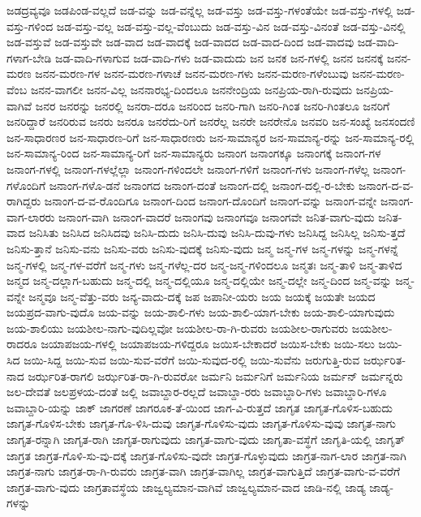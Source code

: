 {ಜಡದ್ರವ್ಯವೂ
ಜಡಪಿಂಡ-ವಲ್ಲದೆ
ಜಡ-ವನ್ನು
ಜಡ-ವನ್ನೆಲ್ಲ
ಜಡ-ವಸ್ತು
ಜಡ-ವಸ್ತು-ಗಳಂತೆಯೇ
ಜಡ-ವಸ್ತು-ಗಳಲ್ಲಿ
ಜಡ-ವಸ್ತು-ಗಳಿಂದ
ಜಡ-ವಸ್ತು-ವಲ್ಲ
ಜಡ-ವಸ್ತು-ವಲ್ಲ-ವೆಂಬುದು
ಜಡ-ವಸ್ತು-ವಿನ
ಜಡ-ವಸ್ತು-ವಿನಂತೆ
ಜಡ-ವಸ್ತು-ವಿನಲ್ಲಿ
ಜಡ-ವಸ್ತುವೆ
ಜಡ-ವಸ್ತುವೇ
ಜಡ-ವಾದ
ಜಡ-ವಾದಕ್ಕೆ
ಜಡ-ವಾದದ
ಜಡ-ವಾದ-ದಿಂದ
ಜಡ-ವಾದವು
ಜಡ-ವಾದಿ-ಗಳಾಗ-ಬೇಡಿ
ಜಡ-ವಾದಿ-ಗಳಾಗುವ
ಜಡ-ವಾದಿ-ಗಳು
ಜಡ-ವಾದುದು
ಜನ
ಜನಕ
ಜನ-ಗಳಲ್ಲಿ
ಜನನ
ಜನನಕ್ಕೆ
ಜನನ-ಮರಣ
ಜನನ-ಮರಣ-ಗಳ
ಜನನ-ಮರಣ-ಗಳಾಚೆ
ಜನನ-ಮರಣ-ಗಳು
ಜನನ-ಮರಣ-ಗಳೆಂಬುವು
ಜನನ-ಮರಣ-ವೆಂಬ
ಜನನ-ವಾಗಲೀ
ಜನನ-ವಿಲ್ಲ
ಜನನಾರಭ್ಯ-ದಿಂದಲೂ
ಜನನೇಂದ್ರಿಯ
ಜನಪ್ರಿಯ-ರಾಗಿ-ರುವುದು
ಜನಪ್ರಿಯ-ವಾಗಿವೆ
ಜನರ
ಜನರನ್ನು
ಜನರಲ್ಲಿ
ಜನರಾ-ದರೂ
ಜನರಿಂದ
ಜನರಿ-ಗಾಗಿ
ಜನರಿ-ಗಿಂತ
ಜನರಿ-ಗಿಂತಲೂ
ಜನರಿಗೆ
ಜನರಿದ್ದಾರೆ
ಜನರಿರುವ
ಜನರು
ಜನರೂ
ಜನರೆದು-ರಿಗೆ
ಜನರೆಲ್ಲ
ಜನರೇ
ಜನರೇನೊ
ಜನವರಿ
ಜನ-ಸಂಖ್ಯೆ
ಜನಸಂದಣಿ
ಜನ-ಸಾಧಾರಣರ
ಜನ-ಸಾಧಾರಣ-ರಿಗೆ
ಜನ-ಸಾಧಾರಣರು
ಜನ-ಸಾಮಾನ್ಯರ
ಜನ-ಸಾಮಾನ್ಯ-ರನ್ನು
ಜನ-ಸಾಮಾನ್ಯ-ರಲ್ಲಿ
ಜನ-ಸಾಮಾನ್ಯ-ರಿಂದ
ಜನ-ಸಾಮಾನ್ಯ-ರಿಗೆ
ಜನ-ಸಾಮಾನ್ಯರು
ಜನಾಂಗ
ಜನಾಂಗಕ್ಕೂ
ಜನಾಂಗಕ್ಕೆ
ಜನಾಂಗ-ಗಳ
ಜನಾಂಗ-ಗಳಲ್ಲಿ
ಜನಾಂಗ-ಗಳಲ್ಲೆಲ್ಲಾ
ಜನಾಂಗ-ಗಳಿಂದಲೇ
ಜನಾಂಗ-ಗಳಿಗೆ
ಜನಾಂಗ-ಗಳು
ಜನಾಂಗ-ಗಳೆಲ್ಲ
ಜನಾಂಗ-ಗಳೊಂದಿಗೆ
ಜನಾಂಗ-ಗಳೊ-ಡನೆ
ಜನಾಂಗದ
ಜನಾಂಗ-ದಂತೆ
ಜನಾಂಗ-ದಲ್ಲಿ
ಜನಾಂಗ-ದಲ್ಲಿ-ರ-ಬೇಕು
ಜನಾಂಗ-ದ-ವ-ರಾಗಿದ್ದರು
ಜನಾಂಗ-ದ-ವ-ರೊಂದಿಗೂ
ಜನಾಂಗ-ದಿಂದ
ಜನಾಂಗ-ದೊಂದಿಗೆ
ಜನಾಂಗ-ವನ್ನು
ಜನಾಂಗ-ವನ್ನೇ
ಜನಾಂಗ-ವಾಗ-ಲಾರರು
ಜನಾಂಗ-ವಾಗಿ
ಜನಾಂಗ-ವಾದರೆ
ಜನಾಂಗವು
ಜನಾಂಗವೂ
ಜನಾಂಗವೇ
ಜನಿತ-ವಾಗು-ವುದು
ಜನಿತ-ವಾದ
ಜನಿಸಿತು
ಜನಿಸಿದ
ಜನಿಸಿದವು
ಜನಿಸಿ-ದುದು
ಜನಿಸಿ-ದುವು
ಜನಿಸಿ-ದುವು-ಗಳು
ಜನಿಸಿದ್ದ
ಜನಿಸಿಲ್ಲ
ಜನಿಸು-ತ್ತದೆ
ಜನಿಸು-ತ್ತಾನೆ
ಜನಿಸು-ವನು
ಜನಿಸು-ವರು
ಜನಿಸು-ವುದಕ್ಕೆ
ಜನಿಸು-ವುದು
ಜನ್ಮ
ಜನ್ಮ-ಗಳ
ಜನ್ಮ-ಗಳನ್ನು
ಜನ್ಮ-ಗಳನ್ನೆ
ಜನ್ಮ-ಗಳಲ್ಲಿ
ಜನ್ಮ-ಗಳ-ವರೆಗೆ
ಜನ್ಮ-ಗಳು
ಜನ್ಮ-ಗಳೆಲ್ಲ-ದರ
ಜನ್ಮ-ಜನ್ಮ-ಗಳಿಂದಲೂ
ಜನ್ಮತಃ
ಜನ್ಮ-ತಾಳಿ
ಜನ್ಮ-ತಾಳಿದ
ಜನ್ಮದ
ಜನ್ಮ-ದಲ್ಲಾಗ-ಬಹುದು
ಜನ್ಮ-ದಲ್ಲಿ
ಜನ್ಮ-ದಲ್ಲಿಯೂ
ಜನ್ಮ-ದಲ್ಲಿಯೇ
ಜನ್ಮ-ದಲ್ಲೇ
ಜನ್ಮ-ದಿಂದ
ಜನ್ಮ-ವನ್ನು
ಜನ್ಮ-ವನ್ನೇ
ಜನ್ಮವೂ
ಜನ್ಮ-ವೆತ್ತು-ವರು
ಜನ್ಯ-ವಾದು-ದಕ್ಕೆ
ಜಪ
ಜಪಾನೀ-ಯರು
ಜಯ
ಜಯಕ್ಕೆ
ಜಯತೇ
ಜಯದ
ಜಯಪ್ರದ-ವಾಗು-ವುದೊ
ಜಯ-ವನ್ನು
ಜಯ-ಶಾಲಿ-ಗಳು
ಜಯ-ಶಾಲಿ-ಯಾಗ-ಬೇಕು
ಜಯ-ಶಾಲಿ-ಯಾಗುವುದು
ಜಯ-ಶಾಲಿಯು
ಜಯಶೀಲ-ನಾಗು-ವುದಿಲ್ಲವೋ
ಜಯಶೀಲ-ರಾ-ಗಿ-ರುವರು
ಜಯಶೀಲ-ರಾಗುವರು
ಜಯಶೀಲ-ರಾದರೂ
ಜಯಾಪಜಯ-ಗಳಲ್ಲಿ
ಜಯಾಪಜಯ-ಗಳಿದ್ದರೂ
ಜಯಿಸ-ಬೇಕಾದರೆ
ಜಯಿಸ-ಬೇಕು
ಜಯಿ-ಸಲು
ಜಯಿ-ಸಿದ
ಜಯಿ-ಸಿದ್ದ
ಜಯಿ-ಸುವ
ಜಯಿ-ಸುವ-ವರೆಗೆ
ಜಯಿ-ಸುವುದ-ರಲ್ಲಿ
ಜಯಿ-ಸುವೆನು
ಜರುಗುತ್ತಿ-ರುವ
ಜರ್ಝರಿತ-ನಾದ
ಜರ್ಝರಿತ-ರಾಗಲಿ
ಜರ್ಝರಿತ-ರಾ-ಗಿ-ರುವರೋ
ಜರ್ಮನಿ
ಜರ್ಮನಿಗೆ
ಜರ್ಮನಿಯ
ಜರ್ಮನ್
ಜರ್ಮನ್ನರು
ಜಲ-ದೇವತೆ
ಜಲಪ್ರಳಯ-ದಂತೆ
ಜಲ್ಲಿ
ಜವಾಬ್ದಾರ-ರಲ್ಲದೆ
ಜವಾಬ್ದಾ-ರರು
ಜವಾಬ್ದಾರಿ-ಗಳು
ಜವಾಬ್ದಾರಿ-ಗಳೂ
ಜವಾಬ್ದಾರಿ-ಯನ್ನು
ಜಾಕ್
ಜಾಗರಣೆ
ಜಾಗರೂಕ-ತೆ-ಯಿಂದ
ಜಾಗ-ವಿ-ರುತ್ತದೆ
ಜಾಗೃತ
ಜಾಗೃತ-ಗೊಳಿಸ-ಬಹುದು
ಜಾಗೃತ-ಗೊಳಿಸ-ಬೇಕು
ಜಾಗೃತ-ಗೊ-ಳಿಸಿ-ದುವು
ಜಾಗೃತ-ಗೊಳಿಸು-ವುದು
ಜಾಗೃತ-ಗೊಳಿಸು-ವುವು
ಜಾಗೃತ-ನಾಗು
ಜಾಗೃತ-ರನ್ನಾಗಿ
ಜಾಗೃತ-ರಾಗಿ
ಜಾಗೃತ-ರಾಗುವುದು
ಜಾಗೃತ-ವಾಗು-ವುದು
ಜಾಗೃತಾ-ವಸ್ಥೆಗೆ
ಜಾಗೃತಿ-ಯಲ್ಲಿ
ಜಾಗೃತ್
ಜಾಗ್ರತ
ಜಾಗ್ರತ-ಗೊಳಿ-ಸು-ವು-ದಕ್ಕೆ
ಜಾಗ್ರತ-ಗೊಳಿಸು-ವುದೇ
ಜಾಗ್ರತ-ಗೊಳ್ಳುವುದು
ಜಾಗ್ರತ-ನಾಗ-ಲಾರ
ಜಾಗ್ರತ-ನಾಗಿ
ಜಾಗ್ರತ-ನಾಗು
ಜಾಗ್ರತ-ರಾ-ಗಿ-ರುವರು
ಜಾಗ್ರತ-ವಾಗಿ
ಜಾಗ್ರತ-ವಾಗಿಲ್ಲ
ಜಾಗ್ರತ-ವಾಗುತ್ತಿದೆ
ಜಾಗ್ರತ-ವಾಗು-ವ-ವರೆಗೆ
ಜಾಗ್ರತ-ವಾಗು-ವುದು
ಜಾಗ್ರತಾವಸ್ಥೆಯ
ಜಾಜ್ವಲ್ಯಮಾನ-ವಾಗಿವೆ
ಜಾಜ್ವಲ್ಯಮಾನ-ವಾದ
ಜಾಡಿ-ನಲ್ಲಿ
ಜಾಡ್ಯ
ಜಾಡ್ಯ-ಗಳನ್ನು
}
